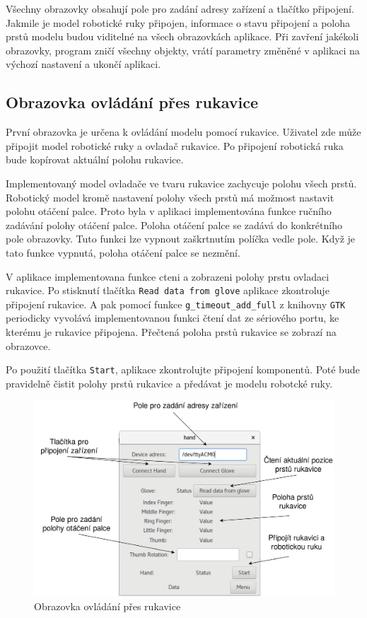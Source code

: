 \documentclass[thesis=B,czech]{FITthesis}[2012/06/26]
\begin{document}
Všechny obrazovky obsahují pole pro zadání adresy zařízení a tlačítko připojení. Jakmile je model robotické ruky připojen, informace o stavu připojení a poloha prstů modelu budou viditelné na všech obrazovkách aplikace. Při zavření jakékoli obrazovky, program zničí všechny objekty, vrátí parametry změněné v aplikaci na výchozí nastavení a ukončí aplikaci.


\subsection{Obrazovka ovládání přes rukavice}

První obrazovka je určena k ovládání modelu pomocí rukavice. Uživatel zde může připojit model robotické ruky a ovladač rukavice. Po připojení robotická ruka bude kopírovat aktuální polohu rukavice. 


Implementovaný model ovladače ve tvaru rukavice zachycuje polohu všech prstů. Robotický model kromě nastavení polohy všech prstů  má možmost nastavit polohu otáčení palce. Proto byla v aplikaci implementována funkce ručního zadávání polohy otáčení palce. Poloha otáčení palce se zadává do konkrétního pole obrazovky. Tuto funkci lze vypnout zaškrtnutím políčka vedle pole. Když je tato funkce vypnutá, poloha otáčení palce se nezmění.


V aplikace implementovana funkce cteni a zobrazeni polohy prstu ovladaci rukavice. Po stisknutí tlačítka \texttt{Read data from glove} aplikace zkontroluje připojení rukavice. A pak pomocí funkce \texttt{g\_timeout\_add\_full} z knihovny \texttt{GTK} periodicky vyvolává implementovanou funkci čtení dat ze sériového portu, ke kterému je rukavice připojena. Přečtená poloha prstů rukavice se zobrazí na obrazovce.


Po použití tlačítka \texttt{Start}, aplikace zkontrolujte připojení komponentů. Poté bude pravidelně čistit polohy prstů rukavice a předávat je modelu robotcké ruky.


 \begin{figure}[H]
\centering
\includegraphics[scale=0.22]{./image/AppScreen1.png}
\caption{Obrazovka ovládání přes rukavice}
\label{fig:AppScreen1}
\end{figure} 
\end{document}
